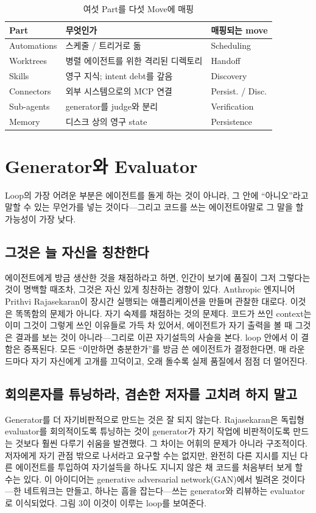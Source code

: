 \documentclass[conference]{IEEEtran}
\begin{document}
\begin{table}[!t]
\centering
\caption{여섯 Part를 다섯 Move에 매핑}
\label{tab:3}
\begin{tabularx}{\columnwidth}{@{}lYl@{}}
\toprule
Part & 무엇인가 & 매핑되는 move \\
\midrule
Automations & 스케줄 / 트리거로 돎 & Scheduling \\
Worktrees & 병렬 에이전트를 위한 격리된 디렉토리 & Handoff \\
Skills & 영구 지식; intent debt를 갚음 & Discovery \\
Connectors & 외부 시스템으로의 MCP 연결 & Persist. / Disc. \\
Sub-agents & generator를 judge와 분리 & Verification \\
Memory & 디스크 상의 영구 state & Persistence \\
\bottomrule
\end{tabularx}
\end{table}

\section{Generator와 Evaluator}
Loop의 가장 어려운 부분은 에이전트를 돌게 하는 것이 아니라, 그 안에 ``아니오''라고 말할 수 있는 무언가를 넣는 것이다---그리고 코드를 쓰는 에이전트야말로 그 말을 할 가능성이 가장 낮다.

\subsection{그것은 늘 자신을 칭찬한다}
에이전트에게 방금 생산한 것을 채점하라고 하면, 인간이 보기에 품질이 그저 그렇다는 것이 명백할 때조차, 그것은 자신 있게 칭찬하는 경향이 있다. Anthropic 엔지니어 Prithvi Rajasekaran이 장시간 실행되는 애플리케이션을 만들며 관찰한 대로다. 이것은 똑똑함의 문제가 아니다. 자기 숙제를 채점하는 것의 문제다. 코드가 쓰인 context는 이미 그것이 그렇게 쓰인 이유들로 가득 차 있어서, 에이전트가 자기 출력을 볼 때 그것은 결과를 보는 것이 아니라---그리로 이끈 자기설득의 사슬을 본다. loop 안에서 이 결함은 증폭된다. 모든 ``이만하면 충분한가''를 방금 쓴 에이전트가 결정한다면, 매 라운드마다 자기 자신에게 고개를 끄덕이고, 오래 돌수록 실제 품질에서 점점 더 멀어진다.

\subsection{회의론자를 튜닝하라, 겸손한 저자를 고치려 하지 말고}
Generator를 더 자기비판적으로 만드는 것은 잘 되지 않는다. Rajasekaran은 독립형 evaluator를 회의적이도록 튜닝하는 것이 generator가 자기 작업에 비판적이도록 만드는 것보다 훨씬 다루기 쉬움을 발견했다. 그 차이는 어휘의 문제가 아니라 구조적이다. 저자에게 자기 관점 밖으로 나서라고 요구할 수는 없지만, 완전히 다른 지시를 지닌 다른 에이전트를 투입하여 자기설득을 하나도 지니지 않은 채 코드를 처음부터 보게 할 수는 있다. 이 아이디어는 generative adversarial network(GAN)에서 빌려온 것이다---한 네트워크는 만들고, 하나는 흠을 잡는다---쓰는 generator와 리뷰하는 evaluator로 이식되었다. 그림 3이 이것이 이루는 loop를 보여준다.
\end{document}
